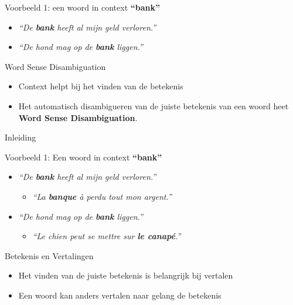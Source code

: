 \documentclass[8pt]{beamer}
\begin{document}
\begin{frame}

    \begin{block}{Voorbeeld 1: een woord in context}
        {\Large\textbf{``bank''}}
        \begin{itemize}
            \item \emph{``De \textbf{bank} heeft al mijn geld verloren.''}
            \item \emph{``De hond mag op de \textbf{bank} liggen.''}
        \end{itemize}
    \end{block}

    \begin{block}{Word Sense Disambiguation}
        \begin{itemize}
            \item Context helpt bij het vinden van de betekenis
            \item Het automatisch disambigueren van de juiste betekenis van een woord heet \textbf{Word Sense Disambiguation}.
        \end{itemize}
    \end{block}
\end{frame}


\begin{frame}{Inleiding}

    \begin{block}{Voorbeeld 1: Een woord in context}
        {\Large\textbf{``bank''}}
        \begin{itemize}
            \item \emph{``De \textbf{bank} heeft al mijn geld verloren.''}
            \begin{itemize}
                \item \emph{``La \textbf{banque} à perdu tout mon argent.''}
            \end{itemize}
            \item \emph{``De hond mag op de \textbf{bank} liggen.''}
            \begin{itemize}
                \item \emph{``Le chien peut se mettre sur \textbf{le canapé}.''}
            \end{itemize}
        \end{itemize}
    \end{block}

    \begin{block}{Betekenis en Vertalingen}
        \begin{itemize}
            \item Het vinden van de juiste betekenis is belangrijk bij vertalen
            \item Een woord kan anders vertalen naar gelang de betekenis
        \end{itemize}
    \end{block}


\end{frame}
\end{document}
